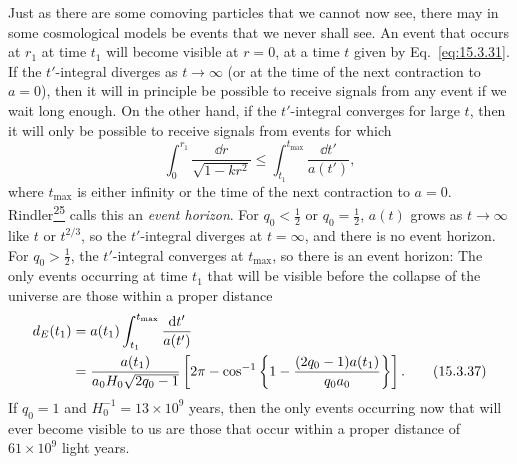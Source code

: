 Just as there are some comoving particles that we cannot now see, there may in
some cosmological models be events that we never shall see. An event that
occurs at \(r_1\) at time \(t_1\) will become visible at \(r=0\), at a time
\(t\) given by Eq.~\eqref{eq:15.3.31}. If the \(t'\)-integral diverges as
\(t\to\infty\) (or at the time of the next contraction to \(a=0\)), then it
will in principle be possible to receive signals from any event if we wait
long enough. On the other hand, if the \(t'\)-integral converges for large
\(t\), then it will only be possible to receive signals from events for which
\[
  \int_0^{r_1}\frac{\dd r}{\sqrt{1-kr^2}}
  \le
  \int_{t_1}^{t_{\max}}\frac{\dd t'}{a(t')},
\]
where \(t_{\max}\) is either infinity or the time of the next contraction to
\(a=0\). Rindler\hyperref[ch15-ref-25]{\textsuperscript{25}} calls this an
\emph{event horizon}. For \(q_0<\tfrac12\) or \(q_0=\tfrac12\), \(a(t)\)
grows as \(t\to\infty\) like \(t\) or \(t^{2/3}\), so the \(t'\)-integral
diverges at \(t=\infty\), and there is no event horizon. For
\(q_0>\tfrac12\), the \(t'\)-integral converges at \(t_{\max}\), so there
is an event horizon: The only events occurring at time \(t_1\) that will be
visible before the collapse of the universe are those within a proper distance
\begin{align}
  d_E(t_1)
  &=
  a(t_1)\int_{t_1}^{t_{\max}}\frac{\mathop{}\!\mathrm{d} t'}{a(t')}
  \notag\\
  &=
  \frac{a(t_1)}{a_0H_0\sqrt{2q_0-1}}
  \left[
    2\pi
    -\cos^{-1}
    \left\{
      1-\frac{(2q_0-1)a(t_1)}{q_0a_0}
    \right\}
  \right].
  \tag{15.3.37}\label{eq:15.3.37}
\end{align}
If \(q_0=1\) and \(H_0^{-1}=13\times10^9\) years, then the only events
occurring now that will ever become visible to us are those that occur within
a proper distance of \(61\times10^9\) light years.
